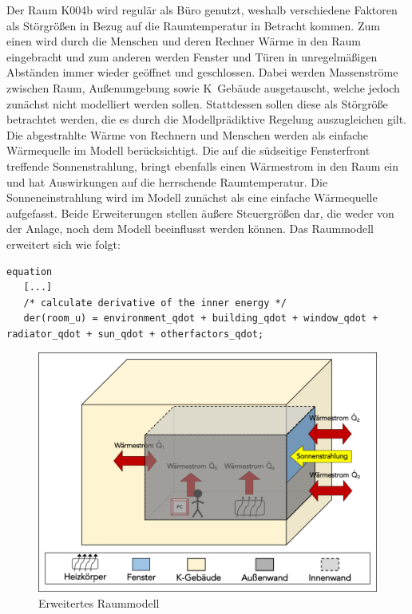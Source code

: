 Der Raum K004b wird regulär als Büro genutzt, weshalb verschiedene Faktoren als Störgrößen in Bezug auf die Raumtemperatur in Betracht kommen. Zum einen wird durch die Menschen und deren Rechner Wärme in den Raum eingebracht und zum anderen werden Fenster und Türen in unregelmäßigen Abständen immer wieder geöffnet und geschlossen. Dabei werden Massenströme zwischen Raum, Außenumgebung sowie K~Gebäude ausgetauscht, welche jedoch zunächst nicht modelliert werden sollen. Stattdessen sollen diese als Störgröße betrachtet werden, die es durch die Modellprädiktive Regelung auszugleichen gilt. Die abgestrahlte Wärme von Rechnern und Menschen werden als einfache Wärmequelle im Modell berücksichtigt. 
Die auf die südseitige Fensterfront treffende Sonnenstrahlung, bringt ebenfalls einen Wärmestrom in den Raum ein und hat Auswirkungen auf die herrschende Raumtemperatur. Die Sonneneinstrahlung  wird im Modell zunächst als eine einfache Wärmequelle aufgefasst.
Beide Erweiterungen stellen äußere Steuergrößen dar, die weder von der Anlage, noch dem Modell beeinflusst werden können. Das Raummodell erweitert sich wie folgt:

\begin{lstlisting}[language=Modelica, caption={Erweitertes Gleichungssystem des Raummodells unter Berücksichtigung der Sonneneinstrahlung und weiterer Störgrößen},label=lst:raumdrei]
equation
   [...]
   /* calculate derivative of the inner energy */
   der(room_u) = environment_qdot + building_qdot + window_qdot + radiator_qdot + sun_qdot + otherfactors_qdot;
\end{lstlisting}

\begin{figure}
\centering
\includegraphics[width=\textwidth]{abbildungen/20160317_raumzwei}
\caption{Erweitertes Raummodell}
\label{fig:raumdrei}
\end{figure}


